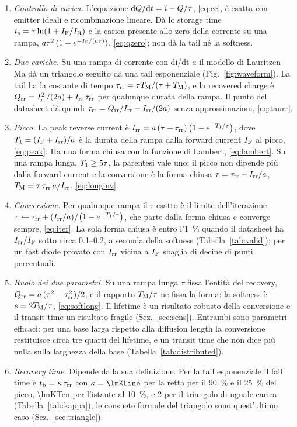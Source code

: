 \documentclass[10pt,a4paper]{scrartcl}
\let\newcommand\pdvaluedefine
\newcommand{\IF}{I_\mathrm{F}}
\newcommand{\IR}{I_\mathrm{R}}
\newcommand{\Irr}{I_\mathrm{rr}}
\newcommand{\Qrr}{Q_\mathrm{rr}}
\newcommand{\tb}{t_\mathrm{b}}
\newcommand{\ts}{t_\mathrm{s}}
\newcommand{\taurr}{\tau_\mathrm{rr}}
\newcommand{\TM}{T_\mathrm{M}}
\newcommand{\Tone}{T_1}
\newcommand{\diff}{\mathrm{d}}
\begin{document}
\begin{enumerate}
\item \emph{Controllo di carica.} L'equazione $\diff Q/\diff t = i - Q/\tau$, \eqref{eq:cc}, è esatta con emitter ideali e ricombinazione lineare. Dà lo storage time $\ts = \tau\ln(1+\IF/\IR)$ e la carica presente allo zero della corrente su una rampa, $a\tau^2\,(1-e^{-\IF/(a\tau)})$, \eqref{eq:qzero}; non dà la tail né la softness.
\item \emph{Due cariche.} Su una rampa di corrente con di/dt $a$ il modello di Lauritzen--Ma dà un triangolo seguito da una tail esponenziale (Fig.~\ref{fig:waveform}). La tail ha la costante di tempo $\taurr = \tau\TM/(\tau+\TM)$, e la recovered charge è $\Qrr = \Irr^2/(2a) + \Irr\,\taurr$ per qualunque durata della rampa. Il punto del datasheet dà quindi $\taurr = \Qrr/\Irr - \Irr/(2a)$ senza approssimazioni, \eqref{eq:taurr}.
\item \emph{Picco.} La peak reverse current è $\Irr = a\,(\tau-\taurr)\,\bigl(1-e^{-\Tone/\tau}\bigr)$, dove $\Tone = (\IF+\Irr)/a$ è la durata della rampa dalla forward current $\IF$ al picco, \eqref{eq:peak}. Ha una forma chiusa con la funzione di Lambert, \eqref{eq:lambert}. Su una rampa lunga, $\Tone \geq 5\tau$, la parentesi vale uno: il picco non dipende più dalla forward current e la conversione è la forma chiusa $\tau = \taurr + \Irr/a$, $\TM = \tau\,\taurr\,a/\Irr$, \eqref{eq:longinv}.
\item \emph{Conversione.} Per qualunque rampa il $\tau$ esatto è il limite dell'iterazione $\tau \leftarrow \taurr + (\Irr/a)\big/\bigl(1-e^{-\Tone/\tau}\bigr)$, che parte dalla forma chiusa e converge sempre, \eqref{eq:iter}. La sola forma chiusa è entro l'\SI{1}{\percent} quando il datasheet ha $\Irr/\IF$ sotto circa \numrange{0.1}{0.2}, a seconda della softness (Tabella~\ref{tab:valid}); per un fast diode provato con $\Irr$ vicina a $\IF$ sbaglia di decine di punti percentuali.
\item \emph{Ruolo dei due parametri.} Su una rampa lunga $\tau$ fissa l'entità del recovery, $\Qrr = a\,(\tau^2-\taurr^2)/2$, e il rapporto $\TM/\tau$ ne fissa la forma: la softness è $s = 2\TM/\tau$, \eqref{eq:softlong}. Il lifetime è un risultato robusto della conversione e il transit time un risultato fragile (Sez.~\ref{sec:sens}). Entrambi sono parametri efficaci: per una base larga rispetto alla diffusion length la conversione restituisce circa tre quarti del lifetime, e un transit time che non dice più nulla sulla larghezza della base (Tabella~\ref{tab:distributed}).
\item \emph{Recovery time.} Dipende dalla sua definizione. Per la tail esponenziale il fall time è $\tb = \kappa\,\taurr$ con $\kappa = \lmKLine$ per la retta per il \SI{90}{\percent} e il \SI{25}{\percent} del picco, \num{\lmKTen} per l'istante al \SI{10}{\percent}, e 2 per il triangolo di uguale carica (Tabella~\ref{tab:kappa}); le consuete formule del triangolo sono quest'ultimo caso (Sez.~\ref{sec:triangle}).

\end{enumerate}
\end{document}

